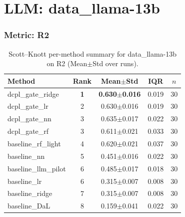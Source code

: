 \section*{LLM: data\_llama-13b}

\subsubsection*{Metric: R2}
\begin{table}[H]
\centering
\scriptsize
\setlength{\tabcolsep}{4pt}
\renewcommand{\arraystretch}{1.1}
\caption{Scott--Knott per-method summary for data\_llama-13b on R2 (Mean$\pm$Std over runs).}
\label{tab:sk_data_llama-13b_R2}
\begin{tabular}{l|c|c|c|c}
\hline
\textbf{Method} & \textbf{Rank} & \textbf{Mean$\pm$Std} & \textbf{IQR} & \textbf{$n$} \\
\hline
\rowcolor{red!15} dcpl\_gate\_ridge & \textbf{1} & \textbf{0.630$\pm$0.016} & 0.019 & 30 \\
dcpl\_gate\_lr & 2 & 0.630$\pm$0.016 & 0.019 & 30 \\
dcpl\_gate\_nn & 3 & 0.635$\pm$0.017 & 0.022 & 30 \\
dcpl\_gate\_rf & 3 & 0.611$\pm$0.021 & 0.033 & 30 \\
baseline\_rf\_light & 4 & 0.620$\pm$0.021 & 0.037 & 30 \\
baseline\_nn & 5 & 0.451$\pm$0.016 & 0.022 & 30 \\
baseline\_llm\_pilot & 6 & 0.485$\pm$0.017 & 0.018 & 30 \\
baseline\_lr & 6 & 0.315$\pm$0.007 & 0.008 & 30 \\
baseline\_ridge & 7 & 0.315$\pm$0.007 & 0.008 & 30 \\
baseline\_DaL & 8 & 0.159$\pm$0.041 & 0.022 & 30 \\
\hline
\end{tabular}
\end{table}

